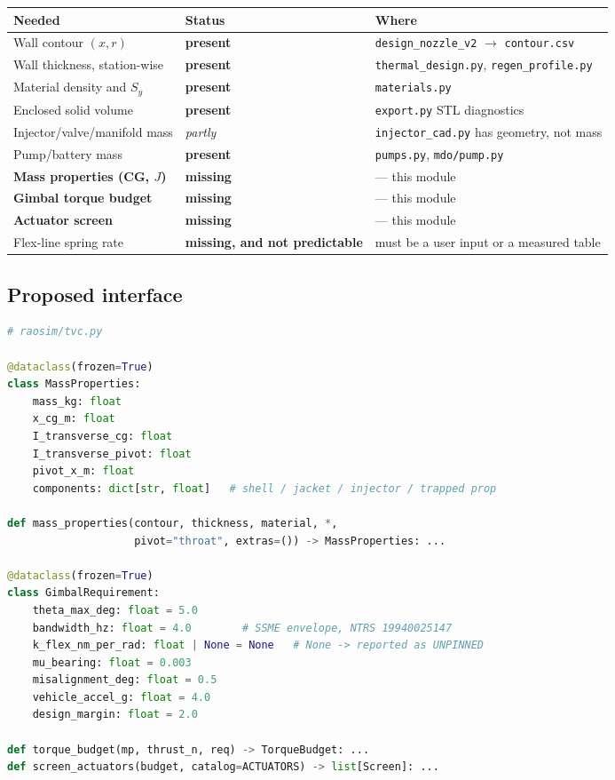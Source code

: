 \documentclass[11pt]{article}
\newcommand{\cmd}[1]{\nolinkurl{#1}}
\begin{document}
\begin{table}[H]\centering\small
\begin{tabular}{@{}p{4.7cm} p{4.0cm} p{6.2cm}@{}}
\toprule
\textbf{Needed} & \textbf{Status} & \textbf{Where}\\
\midrule
Wall contour $(x, r)$ & \textbf{present} & \cmd{design\_nozzle\_v2} $\to$ \cmd{contour.csv}\\
Wall thickness, station-wise & \textbf{present} & \cmd{thermal\_design.py}, \cmd{regen\_profile.py}\\
Material density and $S_y$ & \textbf{present} & \cmd{materials.py}\\
Enclosed solid volume & \textbf{present} & \cmd{export.py} STL diagnostics\\
Injector/valve/manifold mass & \emph{partly} & \cmd{injector\_cad.py} has geometry, not mass\\
Pump/battery mass & \textbf{present} & \cmd{pumps.py}, \cmd{mdo/pump.py}\\
\textbf{Mass properties (CG, $J$)} & \textbf{missing} & --- this module\\
\textbf{Gimbal torque budget} & \textbf{missing} & --- this module\\
\textbf{Actuator screen} & \textbf{missing} & --- this module\\
Flex-line spring rate & \textbf{missing, and not predictable} & must be a user input or a measured table\\
\bottomrule
\end{tabular}
\end{table}

\subsection{Proposed interface}

\begin{lstlisting}[language=Python]
# raosim/tvc.py

@dataclass(frozen=True)
class MassProperties:
    mass_kg: float
    x_cg_m: float
    I_transverse_cg: float
    I_transverse_pivot: float
    pivot_x_m: float
    components: dict[str, float]   # shell / jacket / injector / trapped prop

def mass_properties(contour, thickness, material, *,
                    pivot="throat", extras=()) -> MassProperties: ...

@dataclass(frozen=True)
class GimbalRequirement:
    theta_max_deg: float = 5.0
    bandwidth_hz: float = 4.0        # SSME envelope, NTRS 19940025147
    k_flex_nm_per_rad: float | None = None   # None -> reported as UNPINNED
    mu_bearing: float = 0.003
    misalignment_deg: float = 0.5
    vehicle_accel_g: float = 4.0
    design_margin: float = 2.0

def torque_budget(mp, thrust_n, req) -> TorqueBudget: ...
def screen_actuators(budget, catalog=ACTUATORS) -> list[Screen]: ...
\end{lstlisting}
\end{document}
